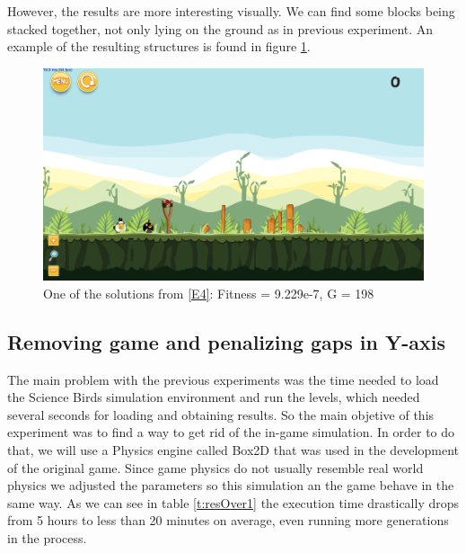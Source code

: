 \documentclass[sigconf]{acmart}
\begin{document}
However, the results are more interesting visually. We can find some blocks 
being stacked together, not only lying on the ground as in previous 
experiment. An example of the resulting structures is found in figure 
\ref{f:e4-1}.

\begin{figure}
	\centering
	\includegraphics[scale=0.2]{level-0-second_crossover_min10_180602_035405.png}
	\caption{One of the solutions from \ref{E4}: Fitness = 9.229e-7, G = 198 
	}\label{f:e4-1}
\end{figure}

\subsection{Removing game and penalizing gaps in Y-axis}\label{E5}

The main problem with the previous experiments was the time needed to
load the Science Birds simulation environment and run the levels,
which needed several seconds for loading and obtaining results. So the
main objetive of this experiment was to find a way to get
rid of the in-game simulation. In order to do that, we will use a Physics engine
called Box2D \cite{catto2011box2d} that was used in the development of the 
original game.
Since game physics do not usually resemble real world physics we adjusted
the parameters so this simulation an the game behave in the same way.
As we can see in table \ref{t:resOver1} the execution time drastically
drops from 5 hours to less than 20 minutes on average, even running
more generations in the process.
\end{document}
